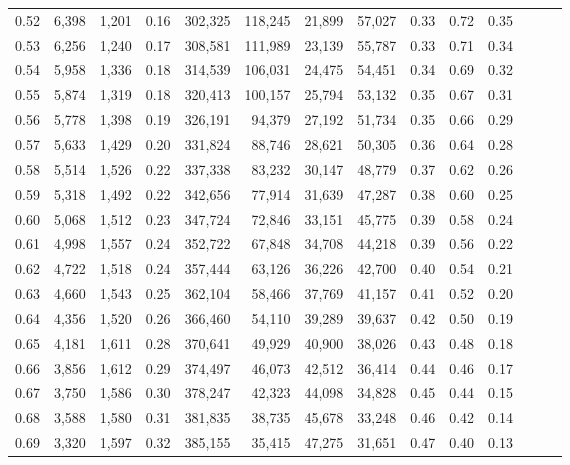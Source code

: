 \begin{tabular}{rrrrrrrrrrrrrr}
0.52 &   6,398 &  1,201 &  0.16 &  302,325 &  118,245 &  21,899 &  57,027 &  0.33 &  0.72 &      0.35 \\
0.53 &   6,256 &  1,240 &  0.17 &  308,581 &  111,989 &  23,139 &  55,787 &  0.33 &  0.71 &      0.34 \\
0.54 &   5,958 &  1,336 &  0.18 &  314,539 &  106,031 &  24,475 &  54,451 &  0.34 &  0.69 &      0.32 \\
0.55 &   5,874 &  1,319 &  0.18 &  320,413 &  100,157 &  25,794 &  53,132 &  0.35 &  0.67 &      0.31 \\
0.56 &   5,778 &  1,398 &  0.19 &  326,191 &   94,379 &  27,192 &  51,734 &  0.35 &  0.66 &      0.29 \\
0.57 &   5,633 &  1,429 &  0.20 &  331,824 &   88,746 &  28,621 &  50,305 &  0.36 &  0.64 &      0.28 \\
0.58 &   5,514 &  1,526 &  0.22 &  337,338 &   83,232 &  30,147 &  48,779 &  0.37 &  0.62 &      0.26 \\
0.59 &   5,318 &  1,492 &  0.22 &  342,656 &   77,914 &  31,639 &  47,287 &  0.38 &  0.60 &      0.25 \\
0.60 &   5,068 &  1,512 &  0.23 &  347,724 &   72,846 &  33,151 &  45,775 &  0.39 &  0.58 &      0.24 \\
0.61 &   4,998 &  1,557 &  0.24 &  352,722 &   67,848 &  34,708 &  44,218 &  0.39 &  0.56 &      0.22 \\
0.62 &   4,722 &  1,518 &  0.24 &  357,444 &   63,126 &  36,226 &  42,700 &  0.40 &  0.54 &      0.21 \\
0.63 &   4,660 &  1,543 &  0.25 &  362,104 &   58,466 &  37,769 &  41,157 &  0.41 &  0.52 &      0.20 \\
0.64 &   4,356 &  1,520 &  0.26 &  366,460 &   54,110 &  39,289 &  39,637 &  0.42 &  0.50 &      0.19 \\
0.65 &   4,181 &  1,611 &  0.28 &  370,641 &   49,929 &  40,900 &  38,026 &  0.43 &  0.48 &      0.18 \\
0.66 &   3,856 &  1,612 &  0.29 &  374,497 &   46,073 &  42,512 &  36,414 &  0.44 &  0.46 &      0.17 \\
0.67 &   3,750 &  1,586 &  0.30 &  378,247 &   42,323 &  44,098 &  34,828 &  0.45 &  0.44 &      0.15 \\
0.68 &   3,588 &  1,580 &  0.31 &  381,835 &   38,735 &  45,678 &  33,248 &  0.46 &  0.42 &      0.14 \\
0.69 &   3,320 &  1,597 &  0.32 &  385,155 &   35,415 &  47,275 &  31,651 &  0.47 &  0.40 &      0.13 \\

\end{tabular}
